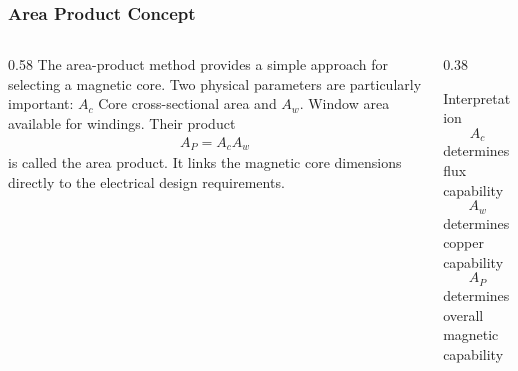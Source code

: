 \begin{frame} 
    \frametitle{Area Product Concept} 
    \begin{columns} 
        \begin{column}{0.58\textwidth} 
            The area-product method provides a simple approach for selecting a magnetic core. 
            \vspace{0.15cm} Two physical parameters are particularly important: 
                $A_c$ 
            Core cross-sectional area and 
                $A_w$. 
            Window area available for windings. Their product 
            \begin{align} 
                A_P=A_cA_w 
            \end{align} is called the area product. 
            \vspace{0.15cm} It links the magnetic core dimensions directly to the electrical design requirements. 
        \end{column} 
        \begin{column}{0.38\textwidth} 
            \begin{block}{Interpretation} \[ A_c \] determines flux capability 
                \vspace{0.1cm} \[ A_w \] determines copper capability 
                \vspace{0.1cm} \[ A_P \] determines overall magnetic capability 
            \end{block} 
        \end{column} 
    \end{columns} 
\end{frame}

